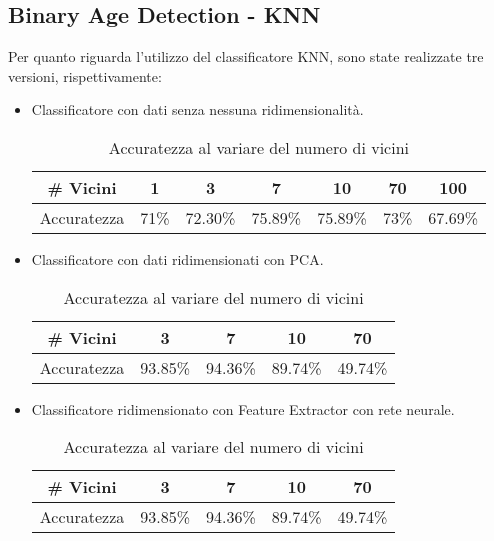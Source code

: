 \documentclass[12pt]{IEEEtran}
\begin{document}
\subsection{Binary Age Detection - KNN}
Per quanto riguarda l'utilizzo del classificatore KNN, sono state realizzate tre versioni, rispettivamente: \\
\begin{itemize}
    \item Classificatore con dati senza nessuna ridimensionalità. 
        \begin{table}[h!]
        \caption {Accuratezza al variare del numero di vicini}
        \begin{adjustbox}{width=\columnwidth}
        \begin{tabular}{|c|c|c|c|c|c|c|}
        \hline
        \# Vicini      &1  &3    &7  &10    &70  &100\\ \hline
        Accuratezza & 71\% &72.30\% & 75.89\% &75.89\% & 73\% & 67.69\%  \\ \hline
        \end{tabular}
        \end{adjustbox}
        \end{table}
        \item Classificatore con dati ridimensionati con PCA. 
        \begin{table}[h!]
        \caption {Accuratezza al variare del numero di vicini}
        \begin{adjustbox}{width=\columnwidth}
        \begin{tabular}{|c|c|c|c|c|}
        \hline
        \# Vicini      &3  & 7    & 10     & 70 \\ \hline
        Accuratezza & 93.85\% & 94.36\% & 89.74\% & 49.74\% \\ \hline
        \end{tabular}
        \end{adjustbox}
        \end{table}
        \item Classificatore ridimensionato con Feature Extractor con rete neurale. 
        \begin{table}[h!]
        \caption {Accuratezza al variare del numero di vicini}
        \begin{adjustbox}{width=\columnwidth}
        \begin{tabular}{|c|c|c|c|c|}
        \hline
        \# Vicini      &3  & 7    & 10     & 70 \\ \hline
        Accuratezza & 93.85\% & 94.36\% & 89.74\% & 49.74\% \\ \hline
        \end{tabular}
        \end{adjustbox}
        \end{table}
    \end{itemize}
    
\end{document}
